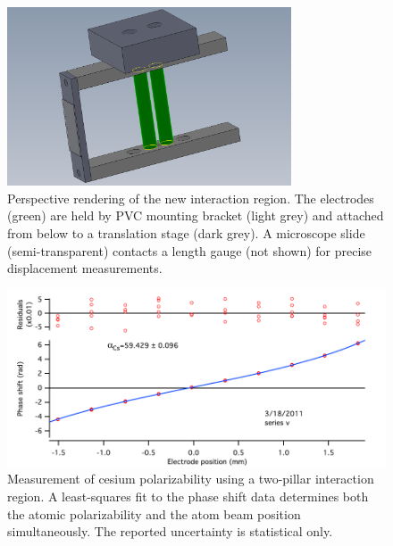 \begin{figure}
\centerline{\includegraphics[width=0.75\textwidth]{Figures/intRegionNeweDrawings.png}}
\caption[Perspective rendering of the new interaction region]{\label{intRegionNewPer}Perspective rendering of the new interaction region. The electrodes (green) are held by PVC mounting bracket (light grey) and attached from below to a translation stage (dark grey). A microscope slide (semi-transparent) contacts a length gauge (not shown) for precise displacement measurements.}
\end{figure}


\begin{figure}
\includegraphics[width=1\textwidth]{Figures/twoPillarAlphaMeas.pdf}
\caption[Measurement of Cs polarizability using a two-pillar interaction region]{\label{twoPillarPolMeas}Measurement of cesium polarizability using a two-pillar interaction region. A least-squares fit to the phase shift data determines both the atomic polarizability and the atom beam position simultaneously. The reported uncertainty is statistical only.}
\end{figure}


